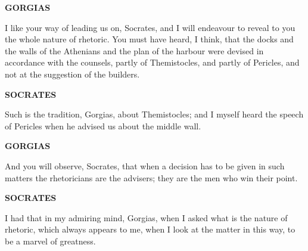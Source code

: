 \documentclass[11pt,letter]{article}
\begin{document}
\par \textbf{GORGIAS}
\par   I like your way of leading us on, Socrates, and I will endeavour to reveal to you the whole nature of rhetoric. You must have heard, I think, that the docks and the walls of the Athenians and the plan of the harbour were devised in accordance with the counsels, partly of Themistocles, and partly of Pericles, and not at the suggestion of the builders.

\par \textbf{SOCRATES}
\par   Such is the tradition, Gorgias, about Themistocles; and I myself heard the speech of Pericles when he advised us about the middle wall.

\par \textbf{GORGIAS}
\par   And you will observe, Socrates, that when a decision has to be given in such matters the rhetoricians are the advisers; they are the men who win their point.

\par \textbf{SOCRATES}
\par   I had that in my admiring mind, Gorgias, when I asked what is the nature of rhetoric, which always appears to me, when I look at the matter in this way, to be a marvel of greatness.
\end{document}
